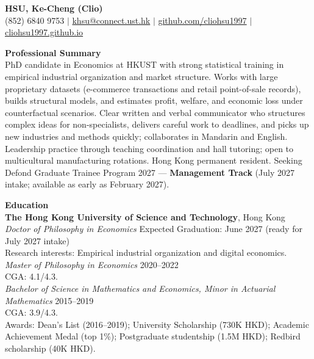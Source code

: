 \documentclass[11pt,letterpaper]{article}
\begin{document}
{\Large \textbf{HSU, Ke-Cheng (Clio)}}\\[1pt]
(852) 6840 9753 \quad $|$ \quad \href{mailto:khsu@connect.ust.hk}{khsu@connect.ust.hk} \quad $|$ \quad \href{https://github.com/cliohsu1997}{github.com/cliohsu1997} \quad $|$ \quad \href{https://cliohsu1997.github.io/}{cliohsu1997.github.io}

\vspace{0.15pt}

{\large \textbf{Professional Summary}}\\[-0.5pt]
PhD candidate in Economics at HKUST with strong statistical training in empirical industrial organization and market structure. Works with large proprietary datasets (e-commerce transactions and retail point-of-sale records), builds structural models, and estimates profit, welfare, and economic loss under counterfactual scenarios. Clear written and verbal communicator who structures complex ideas for non-specialists, delivers careful work to deadlines, and picks up new industries and methods quickly; collaborates in Mandarin and English. Leadership practice through teaching coordination and hall tutoring; open to multicultural manufacturing rotations. Hong Kong permanent resident. Seeking Defond Graduate Trainee Program 2027 --- \textbf{Management Track} (July 2027 intake; available as early as February 2027).

\vspace{0.15pt}

{\large \textbf{Education}}\\[-0.5pt]
\textbf{The Hong Kong University of Science and Technology}, Hong Kong\\
\textit{Doctor of Philosophy in Economics} \hfill Expected Graduation: June 2027 (ready for July 2027 intake)\\
Research interests: Empirical industrial organization and digital economics.\\
\textit{Master of Philosophy in Economics} \hfill 2020--2022\\
CGA: 4.1/4.3.\\
\textit{Bachelor of Science in Mathematics and Economics, Minor in Actuarial Mathematics} \hfill 2015--2019\\
CGA: 3.9/4.3.\\
Awards: Dean's List (2016--2019); University Scholarship (730K HKD); Academic Achievement Medal (top 1\%); Postgraduate studentship (1.5M HKD); Redbird scholarship (40K HKD).

\vspace{0.15pt}
\end{document}
